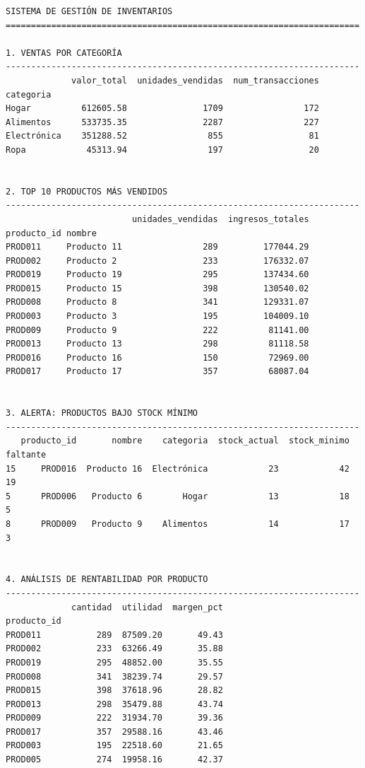 \documentclass[
  doc,
  floatsintext,
  longtable,
  a4paper,
  nolmodern,
  notxfonts,
  notimes,
  12pt,
  colorlinks=true,linkcolor=blue,citecolor=blue,urlcolor=blue]{apa7}
\begin{document}
\begin{verbatim}
SISTEMA DE GESTIÓN DE INVENTARIOS
======================================================================

1. VENTAS POR CATEGORÍA
----------------------------------------------------------------------
             valor_total  unidades_vendidas  num_transacciones
categoria                                                     
Hogar          612605.58               1709                172
Alimentos      533735.35               2287                227
Electrónica    351288.52                855                 81
Ropa            45313.94                197                 20


2. TOP 10 PRODUCTOS MÁS VENDIDOS
----------------------------------------------------------------------
                         unidades_vendidas  ingresos_totales
producto_id nombre                                          
PROD011     Producto 11                289         177044.29
PROD002     Producto 2                 233         176332.07
PROD019     Producto 19                295         137434.60
PROD015     Producto 15                398         130540.02
PROD008     Producto 8                 341         129331.07
PROD003     Producto 3                 195         104009.10
PROD009     Producto 9                 222          81141.00
PROD013     Producto 13                298          81118.58
PROD016     Producto 16                150          72969.00
PROD017     Producto 17                357          68087.04


3. ALERTA: PRODUCTOS BAJO STOCK MÍNIMO
----------------------------------------------------------------------
   producto_id       nombre    categoria  stock_actual  stock_minimo  faltante
15     PROD016  Producto 16  Electrónica            23            42        19
5      PROD006   Producto 6        Hogar            13            18         5
8      PROD009   Producto 9    Alimentos            14            17         3


4. ANÁLISIS DE RENTABILIDAD POR PRODUCTO
----------------------------------------------------------------------
             cantidad  utilidad  margen_pct
producto_id                                
PROD011           289  87509.20       49.43
PROD002           233  63266.49       35.88
PROD019           295  48852.00       35.55
PROD008           341  38239.74       29.57
PROD015           398  37618.96       28.82
PROD013           298  35479.88       43.74
PROD009           222  31934.70       39.36
PROD017           357  29588.16       43.46
PROD003           195  22518.60       21.65
PROD005           274  19958.16       42.37



\end{verbatim}
\end{document}
